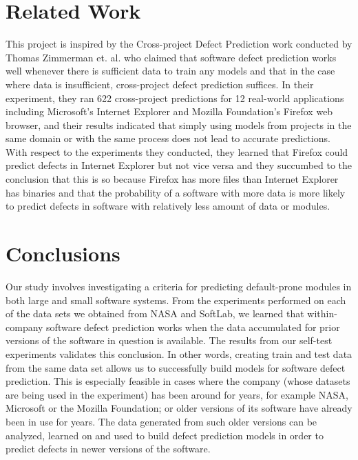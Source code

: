 \documentclass{sig-alternate}
\begin{document}
\section{Related Work}
This project is inspired by the Cross-project Defect Prediction work conducted by Thomas Zimmerman et. al. who claimed that software defect prediction works well whenever there is sufficient data to train any models and that in the case where data is insufficient, cross-project defect prediction suffices\cite{zimmerman09}. In their experiment, they ran 622 cross-project predictions for 12 real-world applications including Microsoft's Internet Explorer and Mozilla Foundation's Firefox web browser, and their results indicated that simply using models from projects in the same domain or with the same process does not lead to accurate predictions. With respect to the experiments they conducted, they learned that Firefox could predict defects in Internet Explorer but not vice versa and they succumbed to the conclusion that this is so because Firefox has more files than Internet Explorer has binaries and that the probability of a software with more data is more likely to predict defects in software with relatively less amount of data or modules. 


\section{Conclusions}
Our study involves investigating a criteria for predicting default-prone modules in both large and small software systems. From the experiments performed on each of the data sets we obtained from NASA and SoftLab, we learned that within-company software defect prediction works when the data accumulated for prior versions of the software in question is available. The results from our self-test experiments validates this conclusion. In other words, creating train and test data from the same data set allows us to successfully build models for software defect prediction. This is especially feasible in cases where the company (whose datasets are being used in the experiment) has been around for years, for example NASA, Microsoft or the Mozilla Foundation; or older versions of its software have already been in use for years. The data generated from such older versions can be analyzed, learned on and used to build defect prediction models in order to predict defects in newer versions of the software.
\end{document}
